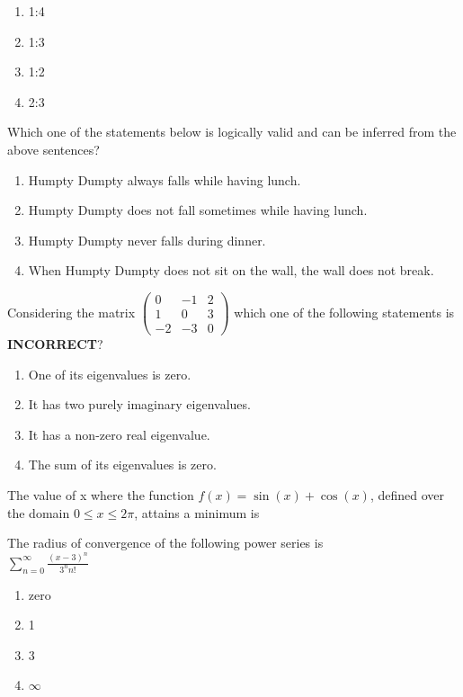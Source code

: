 \begin{enumerate}
    \item 1:4
    \item 1:3
    \item 1:2
    \item 2:3
\end{enumerate}
\item Which one of the statements below is logically valid and can be inferred from the above sentences?
    \begin{enumerate}
        \item Humpty Dumpty always falls while having lunch.
        \item Humpty Dumpty does not fall sometimes while having lunch.
        \item Humpty Dumpty never falls during dinner.
        \item When Humpty Dumpty does not sit on the wall, the wall does not break.
    \end{enumerate}
    \newpage
\item Considering the matrix
    $\begin{pmatrix}
     0 & -1 & 2 \\ 1 & 0 & 3 \\ -2 & -3 & 0   
    \end{pmatrix}$
    which one of the following statements is \textbf{INCORRECT}?
    \begin{enumerate}
        \item One of its eigenvalues is zero.
        \item It has two purely imaginary eigenvalues.
        \item It has a non-zero real eigenvalue.
        \item The sum of its eigenvalues is zero.
    \end{enumerate}
\item The value of x where the function $f(x)=\sin(x)+\cos(x)$, defined over the domain $0\leq x\leq 2\pi$, attains a minimum is
\item The radius of convergence of the following power series is 
\\
    $\sum_{n=0}^{\infty}\frac{(x-3)^n}{3^n n!}$
\begin{enumerate}
    \item zero
    \item 1
    \item 3
    \item $\infty$
\end{enumerate}

